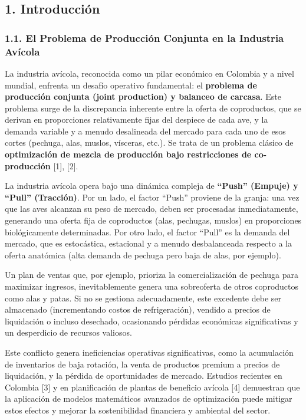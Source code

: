 \documentclass[
  spanish,
  12pt,
]{article}
\begin{document}
\newpage

\subsection{1. Introducción}\label{introducciuxf3n}

\subsubsection{1.1. El Problema de Producción Conjunta en la Industria
Avícola}\label{el-problema-de-producciuxf3n-conjunta-en-la-industria-avuxedcola}

La industria avícola, reconocida como un pilar económico en Colombia y a
nivel mundial, enfrenta un desafío operativo fundamental: el
\textbf{problema de producción conjunta (joint production) y balanceo de
carcasa}. Este problema surge de la discrepancia inherente entre la
oferta de coproductos, que se derivan en proporciones relativamente
fijas del despiece de cada ave, y la demanda variable y a menudo
desalineada del mercado para cada uno de esos cortes (pechuga, alas,
muslos, vísceras, etc.). Se trata de un problema clásico de
\textbf{optimización de mezcla de producción bajo restricciones de
co-producción} {[}1{]}, {[}2{]}.

La industria avícola opera bajo una dinámica compleja de
\textbf{``Push'' (Empuje) y ``Pull'' (Tracción)}. Por un lado, el factor
``Push'' proviene de la granja: una vez que las aves alcanzan su peso de
mercado, deben ser procesadas inmediatamente, generando una oferta fija
de coproductos (alas, pechugas, muslos) en proporciones biológicamente
determinadas. Por otro lado, el factor ``Pull'' es la demanda del
mercado, que es estocástica, estacional y a menudo desbalanceada
respecto a la oferta anatómica (alta demanda de pechuga pero baja de
alas, por ejemplo).

Un plan de ventas que, por ejemplo, prioriza la comercialización de
pechuga para maximizar ingresos, inevitablemente genera una sobreoferta
de otros coproductos como alas y patas. Si no se gestiona adecuadamente,
este excedente debe ser almacenado (incrementando costos de
refrigeración), vendido a precios de liquidación o incluso desechado,
ocasionando pérdidas económicas significativas y un desperdicio de
recursos valiosos.

Este conflicto genera ineficiencias operativas significativas, como la
acumulación de inventarios de baja rotación, la venta de productos
premium a precios de liquidación, y la pérdida de oportunidades de
mercado. Estudios recientes en Colombia {[}3{]} y en planificación de
plantas de beneficio avícola {[}4{]} demuestran que la aplicación de
modelos matemáticos avanzados de optimización puede mitigar estos
efectos y mejorar la sostenibilidad financiera y ambiental del sector.
\end{document}
